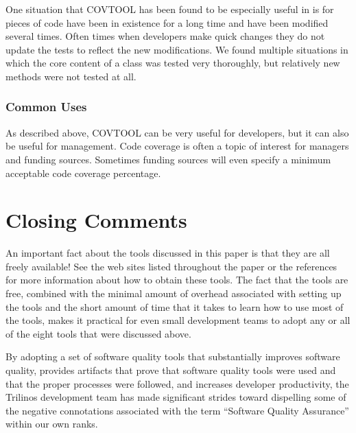 \documentclass[12pt,relax]{article}
\begin{document}
One situation that COVTOOL has been found to be especially useful in is for 
pieces of code have been in existence for a long time and have been modified 
several times.  Often times when developers make quick changes they do 
not update the tests to reflect the new modifications.  We found 
multiple situations in which the core content of a class was tested very 
thoroughly, but relatively new methods were not tested at all.

\subsubsection{Common Uses}

As described above, COVTOOL can be very useful for developers, but it can also
be useful for management.  Code coverage is often a topic of interest for 
managers and funding sources.  Sometimes funding sources will even specify a 
minimum acceptable code coverage percentage.


\section{Closing Comments}

An important fact about the tools discussed in this paper is that they are all 
freely available!  See the web sites listed throughout the paper or the
references for more information about how to obtain these tools.  The fact 
that the tools are free, combined with the minimal amount of overhead 
associated with setting up the tools and the short amount of time that it 
takes to learn how to use most of the tools, makes it practical for even small 
development teams to adopt any or all of the eight tools that were 
discussed above.  

By adopting a set of software quality tools that substantially improves
software quality, provides artifacts that prove that software quality tools 
were used and that the proper processes were followed, and increases developer
productivity, the Trilinos development team has made significant strides 
toward dispelling some of the negative connotations associated with the term
``Software Quality Assurance'' within our own ranks.

\clearpage


%

\end{document}
